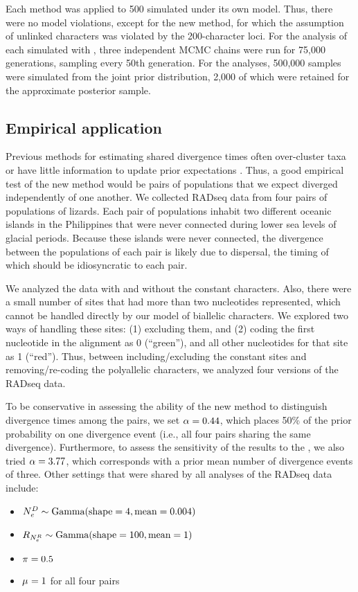 Each method was applied to 500 \datasets simulated under its own model.
Thus, there were no model violations, except for the new method, for which the
assumption of unlinked characters was violated by the 200-character loci.
For the analysis of each simulated \dataset with \ecoevolity, three independent
MCMC chains were run for 75,000 generations, sampling every 50th generation.
For the \dppmsbayes analyses, 500,000 samples were simulated from the joint
prior distribution, 2,000 of which were retained for the approximate posterior
sample.

\subsection{Empirical application}
Previous methods for estimating shared divergence times often over-cluster taxa
\citep{Oaks2012,Oaks2014reply} or have little information to update prior
expectations \citep{Oaks2014dpp}.
Thus, a good empirical test of the new method would be pairs of populations
that we expect diverged independently of one another.
We collected RADseq data from four pairs of populations of  lizards.
Each pair of populations inhabit two different oceanic islands in the
Philippines that were never connected during lower sea levels of glacial
periods.
Because these islands were never connected, the divergence between the
populations of each pair is likely due to dispersal, the timing of which should
be idiosyncratic to each pair.

We analyzed the data with and without the constant characters.
Also, there were a small number of sites that had more than two nucleotides
represented, which cannot be handled directly by our model of biallelic
characters.
We explored two ways of handling these sites:
(1) excluding them, and
(2) coding the first nucleotide in the alignment as 0 (``green''), and all
other nucleotides for that site as 1 (``red'').
Thus, between including/excluding the constant sites and removing/re-coding the
polyallelic characters, we analyzed four versions of the RADseq data.

To be conservative in assessing the ability of the new method to distinguish
divergence times among the pairs, we set $\concentration = 0.44$, which places
50\% of the prior probability on one divergence event (i.e., all four pairs
sharing the same divergence).
Furthermore, to assess the sensitivity of the results to the \concentration, we
also tried $\concentration = 3.77$, which corresponds with a prior mean number
of divergence events of three.
Other settings that were shared by all analyses of the  RADseq data
include:
\begin{itemize}
    \item $\epopsize[\descendantpopindex{}] \sim \dgamma{4}{0.004}$
    \item $\rootrelativepopsize \sim \dgamma{100}{1}$
    \item $\gfreq = 0.5$
    \item $\murate = 1$ for all four pairs
\end{itemize}

